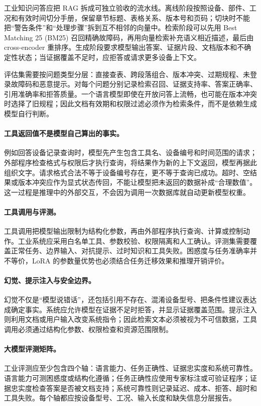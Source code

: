 工业知识问答应把 RAG 拆成可独立验收的流水线。离线阶段按照设备、部件、工况和有效时间切分手册，保留章节标题、表格关系、版本号和页码；切块时不能把“警告条件”和“处理步骤”拆到互不相邻的向量中。检索阶段可以先用 Best Matching 25 (BM25) 召回精确故障码，再用向量检索补充语义相近描述，最后由 cross-encoder 重排序。生成阶段要求模型输出答案、证据片段、文档版本和不确定性状态；当证据覆盖不足时，应拒答或请求更多设备上下文。

评估集需要按问题类型分层：直接查表、跨段落组合、版本冲突、过期规程、未登录故障码和恶意提示。对每个问题分别记录检索召回、证据支持率、答案正确率、引用准确率和拒答质量。一个语言模型即使在开放问答上流畅，也可能在版本冲突时选择了旧规程；因此文档有效期和权限过滤必须作为检索条件，而不是依赖生成模型自行判断。

\paragraph{工具返回值不是模型自己算出的事实。}
例如回答设备记录查询时，模型先产生包含工具名、设备编号和时间范围的请求；外部程序检查格式与权限后才执行查询，将结果作为新的上下文返回，模型再据此组织文字。请求格式合法不等于设备编号存在，更不等于查询已成功。超时、空结果或版本冲突应作为显式状态传回，不能让模型把未返回的数据补成“合理数值”。这一过程是推理中的外部交互，不会因为调用一次数据库就自动更新模型权重。

\paragraph{工具调用与评测。}
工具调用把模型输出限制为结构化参数，再由外部程序执行查询、计算或控制动作。工业系统应采用白名单工具、参数校验、权限隔离和人工确认。评测集需要覆盖正常任务、边界输入、对抗提示、过时知识和工具失败。困惑度与任务准确率并不等价，LoRA 的参数量优势也必须结合任务迁移效果和推理开销评价。

\paragraph{幻觉、提示注入与安全边界。}
幻觉不仅是“模型说错话”，还包括引用不存在、混淆设备型号、把条件性建议表达成确定事实。系统应允许模型在证据不足时拒答，并显示证据覆盖范围。提示注入则利用文档或用户输入改变系统指令；因此检索文本必须被视为不可信数据，工具调用必须通过结构化参数、权限检查和资源范围限制。

\paragraph{大模型评测矩阵。}
工业评测应至少包含四个轴：语言能力、任务正确性、证据忠实度和系统可靠性。语言能力可测困惑度或结构化遵循；任务正确性应使用专家标注或可验证程序；证据忠实度检查答案是否被文档支持；系统可靠性则记录延迟、成本、拒答、超时和工具失败。每个轴都应按设备型号、工况、输入长度和缺失信息分层报告。

